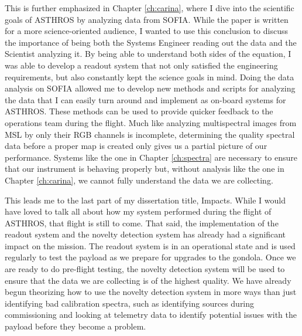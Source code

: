 This is further emphasized in Chapter \ref{ch:carina}, where I dive into the scientific goals of ASTHROS by analyzing data from SOFIA. 
While the paper is written for a more science-oriented audience, I wanted to use this conclusion to discuss the importance of being both the Systems Engineer reading out the data and the Scientist analyzing it.
By being able to understand both sides of the equation, I was able to develop a readout system that not only satisfied the engineering requirements, but also constantly kept the science goals in mind.
Doing the data analysis on SOFIA allowed me to develop new methods and scripts for analyzing the data that I can easily turn around and implement as on-board systems for ASTHROS.
These methods can be used to provide quicker feedback to the operations team during the flight. 
Much like analyzing multispectral images from MSL by only their RGB channels is incomplete, determining the quality spectral data before a proper map is created only gives us a partial picture of our performance.
Systems like the one in Chapter \ref{ch:spectra} are necessary to ensure that our instrument is behaving properly but, without analysis like the one in Chapter \ref{ch:carina}, we cannot fully understand the data we are collecting.

This leads me to the last part of my dissertation title, Impacts.
While I would have loved to talk all about how my system performed during the flight of ASTHROS, that flight is still to come.
That said, the implementation of the readout system and the novelty detection system has already had a significant impact on the mission.
The readout system is in an operational state and is used regularly to test the payload as we prepare for upgrades to the gondola.
Once we are ready to do pre-flight testing, the novelty detection system will be used to ensure that the data we are collecting is of the highest quality.
We have already begun theorizing how to use the novelty detection system in more ways than just identifying bad calibration spectra, such as identifying sources during commissioning and looking at telemetry data to identify potential issues with the payload before they become a problem.

